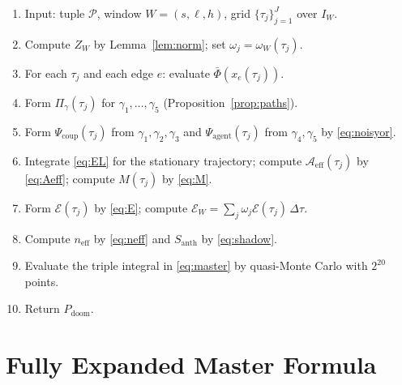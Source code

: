 \documentclass[11pt]{article}
\theoremstyle{remark}
\newcommand{\PD}{P_{\mathrm{doom}}}
\newcommand{\Aeff}{\mathcal{A}_{\mathrm{eff}}}
\newcommand{\Santh}{S_{\mathrm{anth}}}
\begin{document}
\begin{tcolorbox}[title={\textbf{Procedure 2.} Evaluation of $\PD(\mathcal{P})$},colback=white,colframe=black,fonttitle=\small]
\small
\begin{enumerate}[leftmargin=1.5em,itemsep=1pt]
\item Input: tuple $\mathcal{P}$, window $W=(s,\ell,h)$, grid $\{\tau_j\}_{j=1}^{J}$ over $I_W$.
\item Compute $Z_W$ by Lemma~\ref{lem:norm}; set $\omega_j=\omega_W(\tau_j)$.
\item For each $\tau_j$ and each edge $e$: evaluate $\bar\Phi(x_e(\tau_j))$.
\item Form $\Pi_\gamma(\tau_j)$ for $\gamma_1,\dots,\gamma_5$ (Proposition~\ref{prop:paths}).
\item Form $\Psi_{\mathrm{coup}}(\tau_j)$ from $\gamma_1,\gamma_2,\gamma_3$ and $\Psi_{\mathrm{agent}}(\tau_j)$ from $\gamma_4,\gamma_5$ by \eqref{eq:noisyor}.
\item Integrate \eqref{eq:EL} for the stationary trajectory; compute $\Aeff(\tau_j)$ by \eqref{eq:Aeff}; compute $M(\tau_j)$ by \eqref{eq:M}.
\item Form $\mathcal{E}(\tau_j)$ by \eqref{eq:E}; compute $\mathcal{E}_W=\sum_j\omega_j\mathcal{E}(\tau_j)\,\Delta\tau$.
\item Compute $n_{\mathrm{eff}}$ by \eqref{eq:neff} and $\Santh$ by \eqref{eq:shadow}.
\item Evaluate the triple integral in \eqref{eq:master} by quasi-Monte Carlo with $2^{20}$ points.
\item Return $\PD$.
\end{enumerate}
\end{tcolorbox}

\section{Fully Expanded Master Formula}
\end{document}
